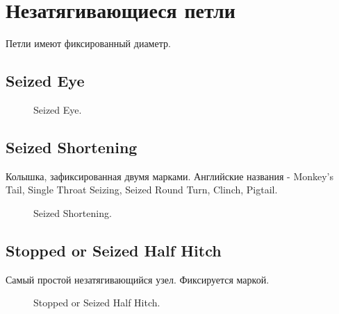 \section{Незатягивающиеся петли}

Петли имеют фиксированный диаметр.

\subsection{Seized Eye}

\begin{figure}[H]\centering
	\begin{minipage}{1\linewidth}
		\begin{center}
			\tcbox[enhanced jigsaw,colframe=black,opacityframe=0.5,opacityback=0.5]
			{\centering{}}
		\end{center}
	\end{minipage}
\caption{Seized Eye.}
\label{ris:Seized_Eye}
\end{figure}

\subsection{Seized Shortening}

Колышка, зафиксированная двумя марками. Английские названия - Monkey’s Tail, Single Throat Seizing, Seized Round Turn, Clinch, Pigtail.

\begin{figure}[H]\centering
	\begin{minipage}{1\linewidth}
		\begin{center}
			\tcbox[enhanced jigsaw,colframe=black,opacityframe=0.5,opacityback=0.5]
			{\centering{}}
		\end{center}
	\end{minipage}
\caption{Seized Shortening.}
\label{ris:Seized_Shortening}
\end{figure}

\subsection{Stopped or Seized Half Hitch}

Самый простой незатягивающийся узел. Фиксируется маркой.

\begin{figure}[H]\centering
	\begin{minipage}{1\linewidth}
		\begin{center}
			\tcbox[enhanced jigsaw,colframe=black,opacityframe=0.5,opacityback=0.5]
			{\centering{}}
		\end{center}
	\end{minipage}
\caption{Stopped or Seized Half Hitch.}
\label{ris:Stopped_or_Seized_Half_Hitch}
\end{figure}

